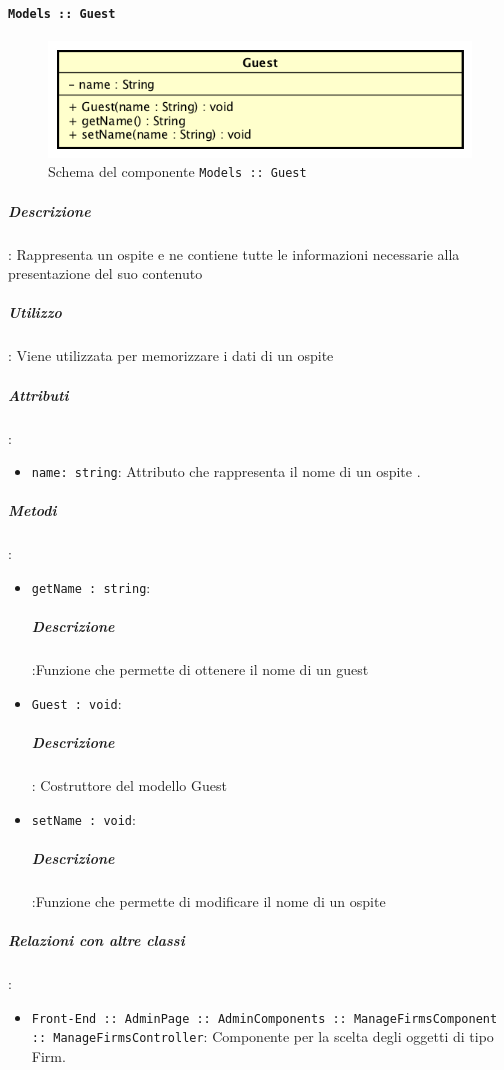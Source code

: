 \documentclass[../DefinizioneDiProdotto_v2.0.0.tex]{subfiles}
\begin{document}
	\paragraph{\texttt{Models :: Guest}}
	\acapo
	\begin{figure}[!h]
		\centering
		\includegraphics[scale=0.6]{Architettura/Front-End/Models/Guest.png}
		\caption{Schema del componente \texttt{Models :: Guest}}
	\end{figure}

		\subparagraph{Descrizione}: Rappresenta un ospite e ne contiene tutte le informazioni necessarie alla presentazione del suo contenuto
		\subparagraph{Utilizzo}: Viene utilizzata per memorizzare i dati di un ospite
		\subparagraph{Attributi}:
		      \begin{itemize}
		      	\item \texttt{name: string}:
		      	      Attributo che rappresenta il nome di un ospite
		      	      .
		      \end{itemize}
		\subparagraph{Metodi}:
		      \begin{itemize}
		      	\item \texttt{getName : string}:
		      	      \subparagraph{Descrizione}:Funzione che permette di ottenere il nome di un guest

		      	\item \texttt{Guest : void}:
		      	     \subparagraph{Descrizione}: Costruttore del modello Guest

		      	\item \texttt{setName : void}:
		      	      \subparagraph{Descrizione}:Funzione che permette di modificare il nome di un ospite
		      \end{itemize}

		\subparagraph{Relazioni con altre classi}:
		      \begin{itemize}
		      	\item \texttt{Front-End :: AdminPage :: AdminComponents :: ManageFirmsComponent :: ManageFirmsController}: Componente per la scelta degli oggetti di tipo Firm.
		      \end{itemize}
\end{document}
